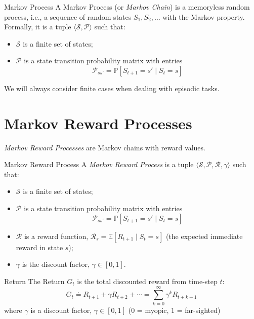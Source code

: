 \begin{defbox}{Markov Process}
A Markov Process (or \textit{Markov Chain}) is a memoryless random process, i.e., a sequence of random states $S_1, S_2, \dots$ with the Markov property. Formally, it is a tuple $\langle \mathcal{S}, \mathcal{P} \rangle$ such that:
\begin{itemize}
    \item $\mathcal{S}$ is a finite set of states;
    \item $\mathcal{P}$ is a state transition probability matrix with entries \[\mathcal{P}_{ss'} = \mathbb{P}[S_{t+1}=s'\mid S_t=s]\]
\end{itemize}
We will always consider finite cases when dealing with episodic tasks.
\end{defbox}

\section{Markov Reward Processes}
\textit{Markov Reward Processes} are Markov chains with reward values.
\begin{defbox}{Markov Reward Process}
A \textit{Markov Reward Process} is a tuple $\langle \mathcal{S}, \mathcal{P}, \mathcal{R}, \gamma \rangle$ such that:
\begin{itemize}
    \item $\mathcal{S}$ is a finite set of states;
    \item $\mathcal{P}$ is a state transition probability matrix with entries \[\mathcal{P}_{ss'} = \mathbb{P}[S_{t+1}=s'\mid S_t=s]\]
    \item $\mathcal{R}$ is a reward function, $\mathcal{R}_s=\mathbb{E}[R_{t+1}\mid S_t=s]$ (the expected immediate reward in state $s$);
    \item $\gamma$ is the discount factor, $\gamma\in[0, 1]$.
\end{itemize}
\end{defbox}

\begin{defbox}{Return}
    The Return $G_t$ is the total discounted reward from time-step $t$:
    \[G_t \doteq R_{t+1} + \gamma R_{t+2} + \cdots = \sum_{k=0}^{\infty} \gamma^k R_{t+k+1}\]
    where $\gamma$ is a discount factor, $\gamma\in[0, 1]$ (0 = myopic, 1 = far-sighted)
\end{defbox}

